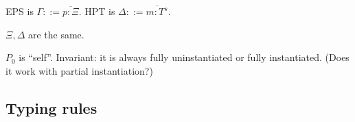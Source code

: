 EPS is $\Gamma ::= \overline{p : \Xi}$. HPT is $\Delta ::= \overline{m : T^s}$.

$\Xi, \Delta$ are the same.

$P_0$ is ``self''.  Invariant: it is always fully uninstantiated or fully instantiated. (Does it work with partial instantiation?)

\subsection{Typing rules}













%

